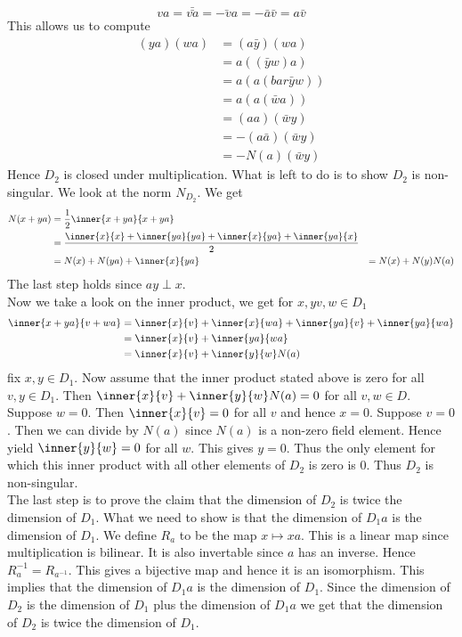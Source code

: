\documentclass[../Thesis.tex]{subfiles}
\begin{document}
\begin{myproof}
\begin{equation}
va = \bar{\bar{va}} = \bar{-va} = -\bar{a}\bar{v} = a\bar{v}
\end{equation}
This allows us to compute
\begin{align*}
(ya)(wa) &= (a\bar{y})(wa) \\
&= a((\bar{y}w)a)\\
&= a(a(bar{\bar{y}w}))\\
&= a(a(\bar{w}a)) \\
&= (aa)(\bar{w}y)\\
&= -(a\bar{a})(\bar{w}y)\\
&= -N(a)(\bar{w}y)
\end{align*}
Hence $D_2$ is closed under multiplication. What is left to do is to show $D_2$ is non-singular. We look at the norm $N_{D_2}$. We get
\begin{align*}
N(x + ya) &= \frac{1}{2}\inner{x+ya}{x+ya}\\
&= \frac{\inner{x}{x} + \inner{ya}{ya} + \inner{x}{ya} + \inner{ya}{x}}{2}\\
&= N(x) + N(ya) + \inner{x}{ya}
&= N(x) + N(y)N(a)
\end{align*}
The last step holds since $ay \perp x$.
\\Now we take a look on the inner product, we get for $x,y v, w \in D_1$
\begin{align*}
\inner{x + ya}{v + wa} &= \inner{x}{v} + \inner{x}{wa} + \inner{ya}{v} + \inner{ya}{wa}\\
&= \inner{x}{v} + \inner{ya}{wa}\\
&= \inner{x}{v} + \inner{y}{w}N(a)
\end{align*}
fix $x, y \in D_1$. Now assume that the inner product stated above is zero for all $v, y \in D_1$. Then $\inner{x}{v} + \inner{y}{w}N(a) = 0$ for all $v, w \in D$. Suppose $w = 0$. Then $\inner{x}{v} = 0$ for all $v$ and hence $ x = 0$. Suppose $v = 0$. Then we can divide by $N(a)$ since $N(a)$ is a non-zero field element. Hence yield $\inner{y}{w} = 0$ for all $w$. This gives $y = 0$. Thus the only element for which this inner product with all other elements of $D_2$ is zero is $0$. Thus $D_2$ is non-singular.
\\The last step is to prove the claim that the dimension of $D_2$ is twice the dimension of $D_1$. What we need to show is that the dimension of $D_1a$ is the dimension of $D_1$. We define $R_a$ to be the map $x \mapsto xa$. This is a linear map since multiplication is bilinear. It is also invertable since $a$ has an inverse. Hence $R^{-1}_a = R_{a^{-1}}$. This gives a bijective map and hence it is an isomorphism. This implies that the dimension of $D_1a$ is the dimension of $D_1$. Since the dimension of $D_2$ is the dimension of $D_1$ plus the dimension of $D_1a$ we get that the dimension of $D_2$ is twice the dimension of $D_1$.
\end{myproof}
\end{document}
